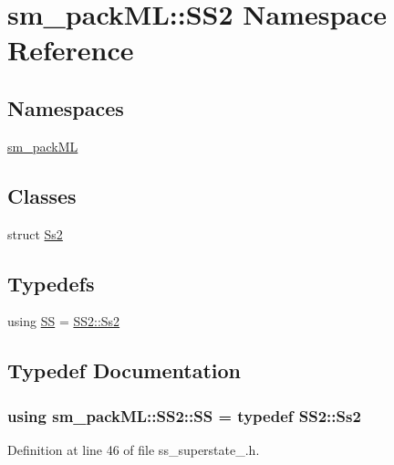 \hypertarget{namespacesm__packML_1_1SS2}{}\section{sm\+\_\+pack\+ML\+:\+:S\+S2 Namespace Reference}
\label{namespacesm__packML_1_1SS2}
\subsection*{Namespaces}
\begin{DoxyCompactItemize}
\item 
 \hyperlink{namespacesm__packML_1_1SS2_1_1sm__packML}{sm\+\_\+pack\+ML}
\end{DoxyCompactItemize}
\subsection*{Classes}
\begin{DoxyCompactItemize}
\item 
struct \hyperlink{structsm__packML_1_1SS2_1_1Ss2}{Ss2}
\end{DoxyCompactItemize}
\subsection*{Typedefs}
\begin{DoxyCompactItemize}
\item 
using \hyperlink{namespacesm__packML_1_1SS2_a748cef212c5e7065bb3e119cceabe26b}{SS} = \hyperlink{structsm__packML_1_1SS2_1_1Ss2}{S\+S2\+::\+Ss2}
\end{DoxyCompactItemize}


\subsection{Typedef Documentation}
\subsubsection[{\texorpdfstring{SS}{SS}}]{\setlength{\rightskip}{0pt plus 5cm}using {\bf sm\+\_\+pack\+M\+L\+::\+S\+S2\+::\+SS} = typedef {\bf S\+S2\+::\+Ss2}}\hypertarget{namespacesm__packML_1_1SS2_a748cef212c5e7065bb3e119cceabe26b}{}\label{namespacesm__packML_1_1SS2_a748cef212c5e7065bb3e119cceabe26b}


Definition at line 46 of file ss\+\_\+superstate\+\_.\+h.

